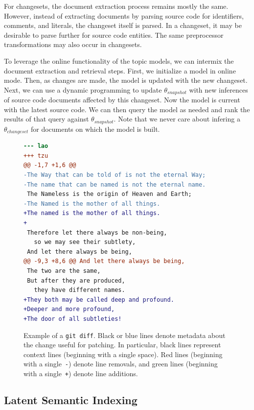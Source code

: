 For changesets, the document extraction process remains mostly the same.
However, instead of extracting documents by parsing source code for identifiers, comments, and literals,
the changeset itself is parsed.
In a changeset, it may be desirable to parse further for source code entities.
The same preprocessor transformations may also occur in changesets.

To leverage the online functionality of the topic models,
we can intermix the document extraction and retrieval steps.
First, we initialize a model in online mode.
Then, as changes are made, the model is updated with the new changeset.
Next, we can use a dynamic programming to update $\theta_{snapshot}$
with new inferences of source code documents affected by this changeset.
Now the model is current with the latest source code.
We can then query the model as needed and rank the results of that query
against $\theta_{snapshot}$.
Note that we never care about infering a $\theta_{changeset}$ for documents on which the model is built.


\begin{figure}[ht]
\centering
\footnotesize
\begin{lstlisting}[language=diff, basicstyle=\ttfamily]
--- lao
+++ tzu
@@ -1,7 +1,6 @@
-The Way that can be told of is not the eternal Way;
-The name that can be named is not the eternal name.
 The Nameless is the origin of Heaven and Earth;
-The Named is the mother of all things.
+The named is the mother of all things.
+
 Therefore let there always be non-being,
   so we may see their subtlety,
 And let there always be being,
@@ -9,3 +8,6 @@ And let there always be being,
 The two are the same,
 But after they are produced,
   they have different names.
+They both may be called deep and profound.
+Deeper and more profound,
+The door of all subtleties!
\end{lstlisting}
\caption{Example of a \texttt{git diff}.
Black or blue lines denote metadata about the change useful for patching.
In particular, black lines represent context lines (beginning with a single space).
Red lines (beginning with a single~\texttt{-}) denote line removals,
and green lines (beginning with a single~\texttt{+}) denote line additions.}
\label{fig:diff}
\vspace{-10pt}
\end{figure}


\subsection{Latent Semantic Indexing}

